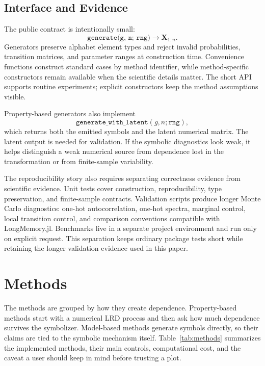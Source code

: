 \documentclass[journal]{IEEEtran}
\newcommand{\code}[1]{\texttt{#1}}
\newcommand{\vect}[1]{\boldsymbol{#1}}
\begin{document}
\subsection{Interface and Evidence}

The public contract is intentionally small:
\begin{equation}
  \code{generate(g, n; rng)} \rightarrow \vect{X}_{1:n}.
\end{equation}
Generators preserve alphabet element types and reject invalid probabilities,
transition matrices, and parameter ranges at construction time.  Convenience
functions construct standard cases by method identifier, while method-specific
constructors remain available when the scientific details matter.  The short API
supports routine experiments; explicit constructors keep the method assumptions
visible.

Property-based generators also implement
\begin{equation}
  \code{generate\_with\_latent}(g,n;\code{rng}),
\end{equation}
which returns both the emitted symbols and the latent numerical matrix.  The
latent output is needed for validation.  If the symbolic diagnostics look weak,
it helps distinguish a weak numerical source from dependence lost in the
transformation or from finite-sample variability.

The reproducibility story also requires separating correctness evidence from
scientific evidence.  Unit tests
cover construction, reproducibility, type preservation, and finite-sample
contracts.  Validation scripts produce longer Monte Carlo diagnostics: one-hot
autocorrelation, one-hot spectra, marginal control, local transition control,
and comparison conventions compatible with LongMemory.jl.  Benchmarks live in a
separate project environment and run only on explicit request.  This separation keeps ordinary package tests short while retaining the
longer validation evidence used in this paper.

\section{Methods}

The methods are grouped by how they create dependence.  Property-based methods
start with a numerical LRD process and then ask how much dependence survives the
symbolizer.  Model-based methods generate symbols directly, so their claims are
tied to the symbolic mechanism itself.  Table~\ref{tab:methods} summarizes the
implemented methods, their main controls, computational cost, and the caveat a
user should keep in mind before trusting a plot.
\end{document}
